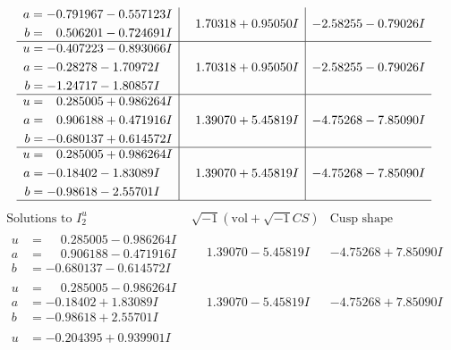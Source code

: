 \documentclass[1p]{elsarticle_modified}
\theoremstyle{definition}
\newcommand{\I}{\sqrt{-1}}
\begin{document}
$$\begin{array}{c|c|c}
\begin{aligned}
a &= -0.791967 - 0.557123 I \\
b &= \phantom{-}0.506201 - 0.724691 I\end{aligned}
 & \phantom{-}1.70318 + 0.95050 I & -2.58255 - 0.79026 I \\ \hline\begin{aligned}
u &= -0.407223 - 0.893066 I \\
a &= -0.28278 - 1.70972 I \\
b &= -1.24717 - 1.80857 I\end{aligned}
 & \phantom{-}1.70318 + 0.95050 I & -2.58255 - 0.79026 I \\ \hline\begin{aligned}
u &= \phantom{-}0.285005 + 0.986264 I \\
a &= \phantom{-}0.906188 + 0.471916 I \\
b &= -0.680137 + 0.614572 I\end{aligned}
 & \phantom{-}1.39070 + 5.45819 I & -4.75268 - 7.85090 I \\ \hline\begin{aligned}
u &= \phantom{-}0.285005 + 0.986264 I \\
a &= -0.18402 - 1.83089 I \\
b &= -0.98618 - 2.55701 I\end{aligned}
 & \phantom{-}1.39070 + 5.45819 I & -4.75268 - 7.85090 I\\
 \hline 
 \end{array}$$\newpage$$\begin{array}{c|c|c}  
\text{Solutions to }I^u_{2}& \I (\text{vol} + \sqrt{-1}CS) & \text{Cusp shape}\\
 \hline 
\begin{aligned}
u &= \phantom{-}0.285005 - 0.986264 I \\
a &= \phantom{-}0.906188 - 0.471916 I \\
b &= -0.680137 - 0.614572 I\end{aligned}
 & \phantom{-}1.39070 - 5.45819 I & -4.75268 + 7.85090 I \\ \hline\begin{aligned}
u &= \phantom{-}0.285005 - 0.986264 I \\
a &= -0.18402 + 1.83089 I \\
b &= -0.98618 + 2.55701 I\end{aligned}
 & \phantom{-}1.39070 - 5.45819 I & -4.75268 + 7.85090 I \\ \hline\begin{aligned}
u &= -0.204395 + 0.939901 I \\

\end{aligned}
\end{array}$$
\end{document}
